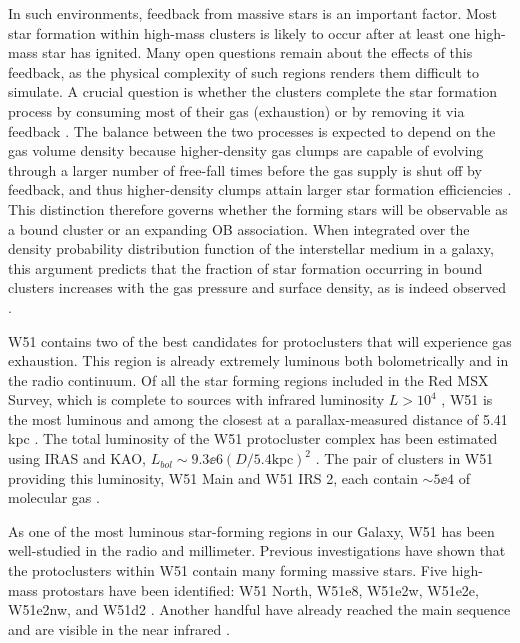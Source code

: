 In such environments, feedback from massive stars is an important factor.  Most star
formation within high-mass clusters is likely to occur after at least one
high-mass star has ignited.  Many open questions remain about the effects of
this feedback, as the physical complexity of such regions renders them
difficult to simulate.  A crucial question is whether the clusters complete the
star formation process by consuming most of their gas (exhaustion) or
by removing it via feedback 
\citep[expulsion;][]{Kruijssen2012b,Longmore2014a,Matzner2015a}.
The balance between the two processes is expected to depend on the gas volume
density because higher-density gas clumps are capable of evolving through a
larger number of free-fall times before the gas supply is shut off by feedback,
and thus higher-density clumps attain larger star formation efficiencies
\citep{Kruijssen2012b}.
This distinction therefore governs whether the forming stars will be observable as a
bound cluster or an expanding OB association.
When integrated over the density probability distribution function of the
interstellar medium in a galaxy, this argument predicts that the fraction of
star formation occurring in bound clusters increases with the gas pressure and
surface density, as is indeed observed \citep{Goddard2010a,Kruijssen2012a,Adamo2015a}.


W51 contains two of the best candidates for protoclusters that will experience
gas exhaustion.  This region is already extremely luminous both bolometrically
and in the radio continuum.  Of all the star forming regions included in the
Red MSX Survey, which is complete to sources with infrared luminosity $L>10^4$
\lsun, W51 is the most luminous \citep{Urquhart2014a} and among the closest at
a parallax-measured distance of 5.41 kpc \citep{Sato2010a,Xu2009a}.  The total
luminosity of the W51 protocluster complex has been estimated using IRAS and
KAO, $L_{bol}\sim9.3\ee{6} (D/5.4\mathrm{kpc})^2$ \lsun
\citep{Harvey1986a,Sievers1991a}.  The pair of clusters in W51 providing this
luminosity, W51 Main and W51 IRS 2, each contain $\sim5\ee{4}$ \msun of
molecular gas \citep{Ginsburg2012a}.

As one of the most luminous star-forming regions in our Galaxy, W51 has been
well-studied in the radio and millimeter.  
Previous investigations have shown that the protoclusters within W51 contain many
forming massive stars. Five high-mass protostars have been identified:
W51 North, W51e8, W51e2w, W51e2e, W51e2nw, and W51d2
\citep{Zhang1997a,Keto2008b,Zapata2008a,Zapata2009a,Zapata2010a,Shi2010b,Shi2010a,Surcis2012a,Goddi2015a,Goddi2016a}.
Another handful have already reached the main sequence and are visible in the
near infrared
\citep{Goldader1994a,Okumura2000a,Kumar2004a,Barbosa2008a,Figueredo2008a}.

